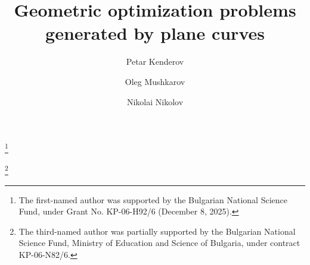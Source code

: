 \documentclass[a4paper,12pt]{amsart}
\begin{document}
\title{Geometric optimization problems
 generated by plane curves}

\author{Petar Kenderov}
\address{P. Kenderov\\Institute of Mathematics and Informatics\\Bulgarian Academy
of Sciences\\Acad. G. Bonchev 8, 1113 Sofia, Bulgaria}

\author{Oleg Mushkarov}
\address{O. Mushkarov\\Institute of Mathematics and Informatics\\Bulgarian Academy
of Sciences\\Acad. G. Bonchev 8, 1113 Sofia, Bulgaria}

\author{Nikolai Nikolov}
\address{N. Nikolov\\Institute of Mathematics and Informatics\\Bulgarian Academy
of Sciences\\Acad. G. Bonchev 8, 1113 Sofia, Bulgaria \vspace{1mm}
\newline Faculty of Information Sciences\\
State University of Library Studies and Information Technologies\\
Shipchenski prohod 69A, 1574 Sofia, Bulgaria}

\thanks{The first-named author was supported by the Bulgarian
National Science Fund,
 under Grant No. KP-06-H92/6 (December 8, 2025).}

\thanks{The third-named author was partially supported by the Bulgarian
National Science Fund, Ministry of Education and Science of Bulgaria, under contract KP-06-N82/6.}



\end{document}
